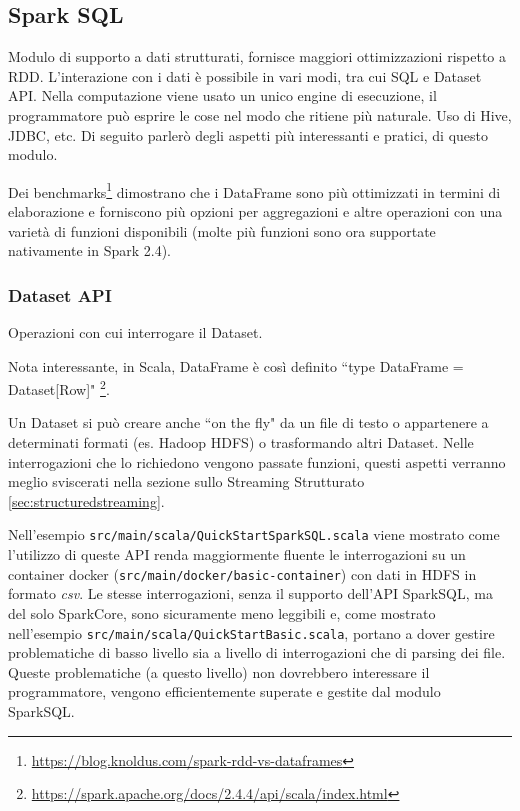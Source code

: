 \documentclass[12pt,italian]{article}
\begin{document}
\subsection{Spark SQL}\label{sec:SparkSQL}
Modulo di supporto a dati strutturati, fornisce maggiori ottimizzazioni rispetto a RDD. L'interazione con i dati è possibile in vari modi, tra cui SQL e Dataset API.
Nella computazione viene usato un unico engine di esecuzione, il programmatore può esprire le cose nel modo che ritiene più naturale. Uso di Hive, JDBC, etc. 
\newline
Di seguito parlerò degli aspetti più interessanti e pratici, di questo modulo.
\par Dei benchmarks\footnote{\url{https://blog.knoldus.com/spark-rdd-vs-dataframes}} dimostrano che i DataFrame sono più ottimizzati in termini di elaborazione e forniscono più opzioni per aggregazioni e altre operazioni con una varietà di funzioni disponibili (molte più funzioni sono ora supportate nativamente in Spark 2.4).
\subsubsection{Dataset API}
Operazioni con cui interrogare il Dataset. 
\par Nota interessante, in Scala, DataFrame è così definito ``type DataFrame = Dataset[Row]" \footnote{\url{https://spark.apache.org/docs/2.4.4/api/scala/index.html}}.
\par Un Dataset si può creare anche ``on the fly" da un file di testo o appartenere a determinati formati (es. Hadoop HDFS) o trasformando altri Dataset.
Nelle interrogazioni che lo richiedono vengono passate funzioni, questi aspetti verranno meglio sviscerati nella sezione sullo Streaming Strutturato \ref{sec:structuredstreaming}.
\par Nell'esempio \texttt{src/main/scala/QuickStartSparkSQL.scala} viene mostrato come l'utilizzo di queste API renda maggiormente fluente le interrogazioni su un container docker (\texttt{src/main/docker/basic-container}) con dati in HDFS in formato \textit{csv}.
\newline 
Le stesse interrogazioni, senza il supporto dell'API SparkSQL, ma del solo SparkCore, sono sicuramente meno leggibili e, come mostrato nell'esempio \texttt{src/main/scala/QuickStartBasic.scala}, portano a dover gestire problematiche di basso livello sia a livello di interrogazioni che di parsing dei file. Queste problematiche (a questo livello) non dovrebbero interessare il programmatore, vengono efficientemente superate e gestite dal modulo SparkSQL.
\end{document}
